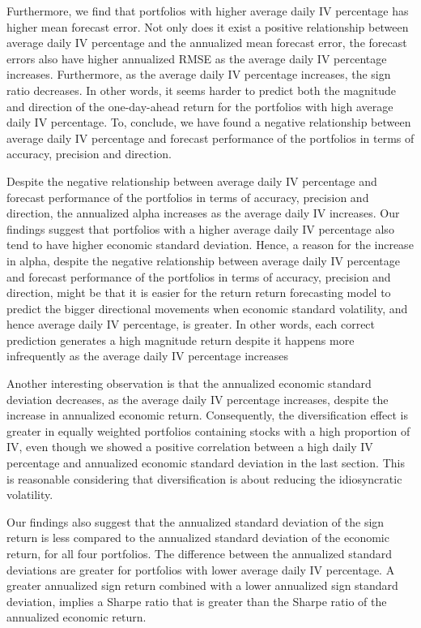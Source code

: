 Furthermore, we find that portfolios with higher average daily IV percentage has higher mean forecast error. Not only does it exist a positive relationship between average daily IV percentage and the annualized mean forecast error, the forecast errors also have higher annualized RMSE as the average daily IV percentage increases. Furthermore, as the average daily IV percentage increases, the sign ratio decreases. In other words, it seems harder to predict both the magnitude and direction of the one-day-ahead return for the portfolios with high average daily IV percentage. To, conclude, we have found a negative relationship between average daily IV percentage and forecast performance of the portfolios in terms of accuracy, precision and direction. 

Despite the negative relationship between average daily IV percentage and forecast performance of the portfolios in terms of accuracy, precision and direction, the annualized alpha increases as the average daily IV increases. Our findings suggest that portfolios with a higher average daily IV percentage also tend to have higher economic standard deviation. Hence, a reason for the increase in alpha, despite the negative relationship between average daily IV percentage and forecast performance of the portfolios in terms of accuracy, precision and direction, might be that it is easier for the return return forecasting model to predict the bigger directional movements when economic standard volatility, and hence average daily IV percentage, is greater. In other words, each correct prediction generates a high magnitude return despite it happens more infrequently as the average daily IV percentage increases

Another interesting observation is that the annualized economic standard deviation decreases, as the average daily IV percentage increases, despite the increase in annualized economic return. Consequently, the diversification effect is greater in equally weighted portfolios containing stocks with a high proportion of IV, even though we showed a positive correlation between a high daily IV percentage and annualized economic standard deviation in the last section. This is reasonable considering that diversification is about reducing the idiosyncratic volatility.

Our findings also suggest that the annualized standard deviation of the sign return is less compared to the annualized standard deviation of the economic return, for all four portfolios. The difference between the annualized standard deviations are greater for portfolios with lower average daily IV percentage. A greater annualized sign return combined with a lower annualized sign standard deviation, implies a Sharpe ratio that is greater than the Sharpe ratio of the annualized economic return. 


